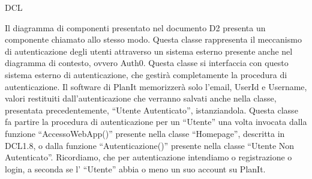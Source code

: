 \begin{listaPersonale}{DCL}
    
    
    Il diagramma di componenti presentato nel documento D2 presenta un componente chiamato allo stesso modo. Questa classe rappresenta il meccanismo di autenticazione degli utenti attraverso un sistema esterno presente anche nel diagramma di contesto, ovvero Auth0. Questa classe si interfaccia con questo sistema esterno di autenticazione, che gestirà completamente la procedura di autenticazione. Il software di PlanIt memorizzerà solo l'email, UserId e Username, valori restituiti dall'autenticazione che verranno salvati anche nella classe, presentata precedentemente, “Utente Autenticato”, istanziandola. Questa classe fa partire la procedura di autenticazione per un “Utente” una volta invocata dalla funzione “AccessoWebApp()” presente nella classe “Homepage”, descritta in DCL1.8, o dalla funzione “Autenticazione()” presente nella classe “Utente Non Autenticato”. Ricordiamo, che per autenticazione intendiamo o registrazione o login, a seconda se l' “Utente” abbia o meno un suo account su PlanIt.
    \begin{comment}
        \begin{center}
            \\
            \blfootnote{Immagine \href{https://github.com/Life-planner/Documentazione/blob/main/D3/img/Diagrammi/png/path/to/img.png}{PNG}/\href{https://github.com/Life-planner/Documentazione/blob/main/D3/img/Diagrammi/svg/path/to/img.svg}{SVG} nome file}
        \end{center}
    \end{comment}



\end{listaPersonale}
